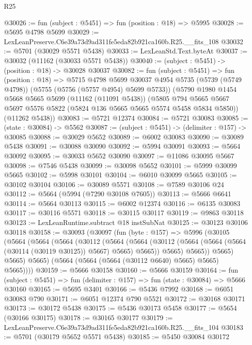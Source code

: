 \begin{lexlean}{R25}
\begin{coremodule}
@30026 := fun (subject : @5451) => fun (position : @18) => @5995
@30028 := @5695 @4798 @5699
@30029 := LexLeanPreserve.C6e39a73d9ad311fe5eda82b921ca160b.R25.__fits_108
@30032 := @5701 (@30029 @5571 @5438)
@30033 := LexLeanStd.Text.byteAt
@30037 := @30032 (@11162 (@30033 @5571 @5438))
@30040 := (subject : @5451) -> (position : @18) -> @30028 @30037
@30082 := fun (subject : @5451) =>
  fun (position : @18) =>
  @5715
    @4798
    @5699
    @30037
    @4954
    @5735
    (@5739 (@5749 @4798))
    (@5755 (@5756 (@5757 @4954) @5699 @5733))
    (@5790
      @1980
      @1454
      @5668
      @5665
      @5699
      (@11162 (@11091 @5438))
      (@5805 @794 @5665 @5667 @5697 @5576 @5822 (@5824 @136 @5665 @5665 @5574 @5458 @5834 @5850))
      (@11262 @5438))
@30083 := @5721 @12374
@30084 := @5721 @30083
@30085 := (state : @30084) -> @5562
@30087 := (subject : @5451) -> (delimiter : @157) -> @30085
@30088 := @30029 @5652
@30089 := @6002 @30083
@30090 := @30089 @5438
@30091 := @30088 @30090
@30092 := @5994 @30091
@30093 := @5664 @30092
@30095 := @30033 @5652 @30090
@30097 := @11086 @30095 @5667
@30098 := @7546 @5438
@30099 := @30098 @5652
@30101 := @5999 @30099 @5665
@30102 := @5998 @30101
@30104 := @6010 @30099 @5665
@30105 := @30102 @30104
@30106 := @30089 @5571
@30108 := @7589 @30106 @24
@30112 := @5664 (@5994 (@7290 @30108 @7605))
@30113 := @5666 @6641
@30114 := @5664 @30113
@30115 := @6002 @12374
@30116 := @6135 @30083
@30117 := @30116 @5571
@30118 := @30115 @30117
@30119 := @9863 @30118
@30123 := LexLeanRuntime.subtract @18 instSubNat
@30125 := @30123 @30106 @30118
@30158 := @30093
    (@30097
      (fun (byte : @157) =>
      @5996
        (@30105
          (@5664
            (@5664
              (@5664
                (@30112
                  (@5664
                    (@5664
                      (@30112 (@5664 (@5664 (@5664 (@30114 (@30119 @30125)) @5667) @5665) @5665))
                      @5665)
                    @5665))
                @5665)
              @5665)
            @5665)
          (@5664 (@5664 (@5664 (@30112 @6640) @5665) @5665) @5665))))
@30159 := @5666 @30158
@30160 := @5666 @30159
@30164 := fun (subject : @5451) => fun (delimiter : @157) => fun (state : @30084) => @5666 @30160
@30165 := @5695 @3401
@30166 := @5436 @7992
@30168 := @6051 @30083 @790
@30171 := @6051 @12374 @790 @5521
@30172 := @30168 @30171
@30173 := @30172 @5438
@30175 := @5436 @30173 @5458
@30177 := @5654 (@30166 @30175)
@30178 := @30165 @30177
@30179 := LexLeanPreserve.C6e39a73d9ad311fe5eda82b921ca160b.R25.__fits_104
@30183 := @5701 (@30179 @5652 @5571 @5438)
@30185 := @5450 @30084 @30172

\end{coremodule}
\end{lexlean}
